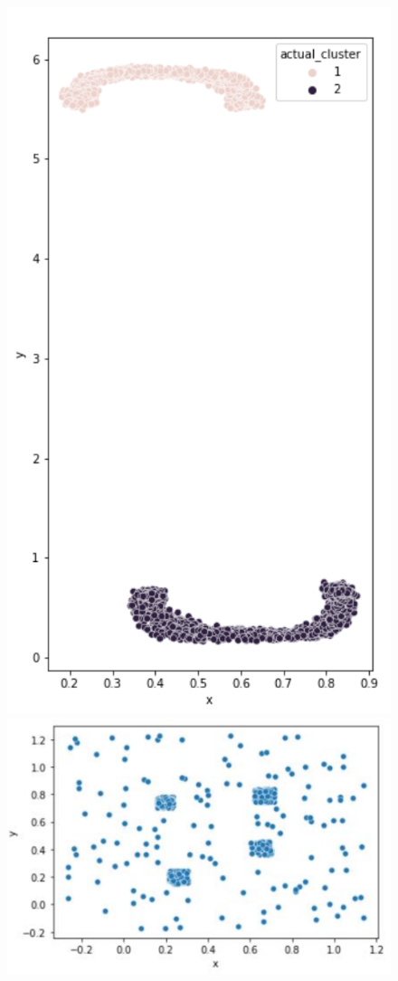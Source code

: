 \documentclass[11pt]{elegantbook}
\begin{document}
\begin{center}\begin{figure}[htbp]
    \centering
    \includegraphics[scale=0.25]{well-separated.png}
    \includegraphics[scale=0.25]{density-based.png}
    \caption{}
    \label{}
\end{figure}\end{center}
\end{document}
